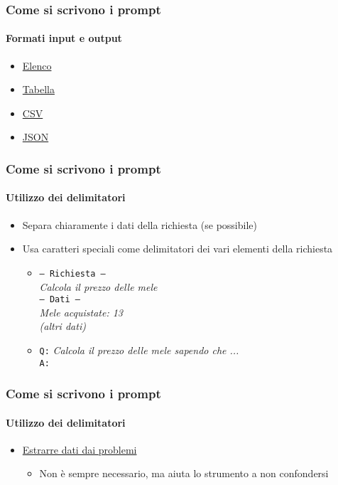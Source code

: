         


\begin{exampleframe}
    \frametitle{Come si scrivono i prompt}
    \framesubtitle{Formati input e output}

    \begin{itemize}
        \item \href{https://chatgpt.com/share/6759ada4-a0c8-8003-9a64-fcbce8b7c494}{Elenco}
        \item \href{https://chatgpt.com/share/67655f30-2080-8003-85d4-f5b3b3540716}{Tabella}
        \item \href{https://chatgpt.com/share/67655f61-6fb0-8003-9cb4-5fc6b04dcee5}{CSV}
        \item \href{https://chatgpt.com/share/67655f87-b9f0-8003-8266-7729917000d8}{JSON}
    \end{itemize}
\end{exampleframe}

\begin{contentframe}
    \frametitle{Come si scrivono i prompt}
    \framesubtitle{Utilizzo dei delimitatori}

    \begin{itemize}
        \item Separa chiaramente i dati della richiesta (se possibile)

        \bigskip
        \item Usa caratteri speciali come delimitatori dei vari elementi della richiesta
        \begin{itemize}
            \item \texttt{--- Richiesta ---}\\
                \textit{Calcola il prezzo delle mele}\\
                \texttt{--- Dati ---}\\
                \textit{Mele acquistate: 13}\\
                \textit{(altri dati)}

            \bigskip
            \item \texttt{Q:} \textit{Calcola il prezzo delle mele sapendo che ...}\\
                \texttt{A:}
        \end{itemize}
    \end{itemize}
\end{contentframe}

\begin{exampleframe}
    \frametitle{Come si scrivono i prompt}
    \framesubtitle{Utilizzo dei delimitatori}

    \begin{itemize}
        \item \href{https://chatgpt.com/share/675af550-6bb0-8003-966d-b7a36cb9fb6e}{Estrarre dati dai problemi}
        \begin{itemize}
            \item Non è sempre necessario, ma aiuta lo strumento a non confondersi
        \end{itemize}
    \end{itemize}
\end{exampleframe}

